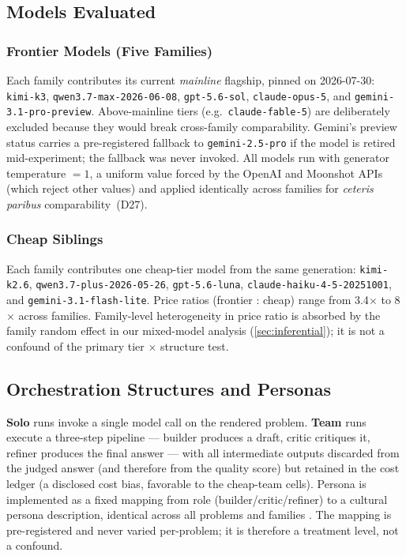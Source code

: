 \documentclass[12pt,a4paper]{article}
\begin{document}
\subsection{Models Evaluated}\label{sec:models}

\subsubsection{Frontier Models (Five Families)}

Each family contributes its current \emph{mainline} flagship, pinned on
2026-07-30: \texttt{kimi-k3}, \texttt{qwen3.7-max-2026-06-08},
\texttt{gpt-5.6-sol}, \texttt{claude-opus-5}, and
\texttt{gemini-3.1-pro-preview}. Above-mainline tiers (e.g.\
\texttt{claude-fable-5}) are deliberately excluded because they would break
cross-family comparability. Gemini's preview status carries a pre-registered
fallback to \texttt{gemini-2.5-pro} if the model is retired mid-experiment; the
fallback was never invoked. All models run with generator temperature $= 1$, a
uniform value forced by the OpenAI and Moonshot APIs (which reject other values)
and applied identically across families for \emph{ceteris paribus}
comparability~(D27).

\subsubsection{Cheap Siblings}

Each family contributes one cheap-tier model from the same generation:
\texttt{kimi-k2.6}, \texttt{qwen3.7-plus-2026-05-26}, \texttt{gpt-5.6-luna},
\texttt{claude-haiku-4-5-20251001}, and \texttt{gemini-3.1-flash-lite}. Price
ratios (frontier : cheap) range from 3.4$\times$ to 8$\times$ across families.
Family-level heterogeneity in price ratio is absorbed by the family random
effect in our mixed-model analysis (\cref{sec:inferential}); it is not a
confound of the primary tier $\times$ structure test.

\subsection{Orchestration Structures and Personas}

\textbf{Solo} runs invoke a single model call on the rendered problem.
\textbf{Team} runs execute a three-step pipeline --- builder produces a draft,
critic critiques it, refiner produces the final answer --- with all intermediate
outputs discarded from the judged answer (and therefore from the quality score)
but retained in the cost ledger (a disclosed cost bias, favorable to the
cheap-team cells). Persona is implemented as a fixed mapping from role
(builder/critic/refiner) to a cultural persona description, identical across all
problems and families \citep{Hariri2026b}. The mapping is pre-registered and
never varied per-problem; it is therefore a treatment level, not a confound.
\end{document}
